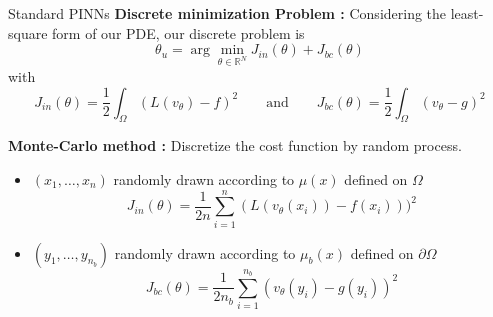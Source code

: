 \begin{frame}{Standard PINNs}
	\textbf{Discrete minimization Problem :} Considering the least-square form of our PDE, our discrete problem is
	\begin{equation}
		\theta_u=\arg\min_{\theta\in\mathbb{R}^N} J_{in}(\theta)+J_{bc}(\theta) \label{minpb_deepritz}
	\end{equation}
	with 
	\begin{equation*}
		J_{in}(\theta)=\frac{1}{2}\int_\Omega (L(v_\theta) - f)^2  \qquad \text{and} \qquad J_{bc}(\theta)=\frac{1}{2}\int_\Omega (v_\theta-g)^2
	\end{equation*}	
	
	\textbf{Monte-Carlo method :} Discretize the cost function by random process.
	
	\begin{itemize}[\textbullet]
		\item $(x_1,\dots,x_n)$ randomly drawn according to $\mu(x)$ defined on $\Omega$ 
		\begin{equation*}
			J_{in}(\theta)=\frac{1}{2n}\sum_{i=1}^n (L(v_\theta(x_i)) - f(x_i)))^2
		\end{equation*}
		\item $(y_1,\dots,y_{n_b})$ randomly drawn according to $\mu_b(x)$ defined on $\partial\Omega$
		\begin{equation*}
			J_{bc}(\theta)=\frac{1}{2n_b}\sum_{i=1}^{n_b} (v_\theta(y_i)-g(y_i))^2
		\end{equation*}
	\end{itemize}	
\end{frame}

